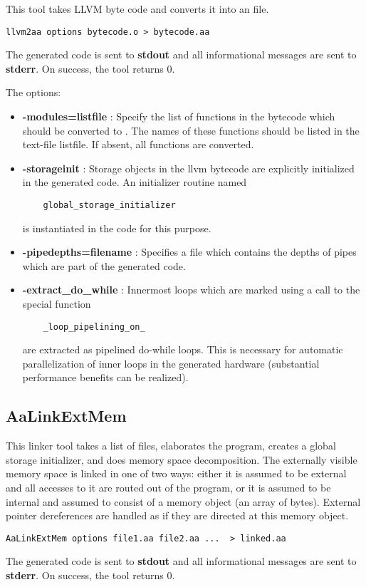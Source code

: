 This tool takes LLVM byte code and converts it into an
\Aa file.
\begin{verbatim}
llvm2aa options bytecode.o > bytecode.aa
\end{verbatim}
The generated \Aa code is sent to {\bf stdout} and all informational
messages are sent to {\bf stderr}.  On success, the tool returns 0.

The options:
\begin{itemize}
\item {\bf -modules=listfile} : Specify the list of functions in the bytecode
which should be converted to \Aa.   The names of these functions should be
listed in the text-file listfile. If absent, all functions
are converted.
\item {\bf -storageinit} :  Storage objects in the llvm bytecode
are explicitly initialized in the generated \Aa code.   An initializer
routine named
\begin{verbatim}
    global_storage_initializer
\end{verbatim}
is instantiated in
the \Aa code for this purpose.
\item {\bf -pipedepths=filename} : Specifies a file which contains
the depths of pipes which are part of the generated \Aa code.
\item {\bf -extract\_do\_while} : Innermost loops which are marked
using a call to the special function 
\begin{verbatim}
    _loop_pipelining_on_
\end{verbatim}
are extracted as pipelined do-while loops.  This is necessary
for automatic parallelization of inner loops in the 
generated hardware (substantial performance benefits can be
realized).
\end{itemize}

\subsection{{\bf AaLinkExtMem}}

This linker tool takes a list of \Aa files, elaborates the program,
creates a global storage initializer, and
does memory space decomposition.  The externally visible memory space is
linked in one of two ways: either it is assumed to be external
and all accesses to it are routed out of the \Aa program,
or it is assumed to be internal and assumed to consist of
a memory object (an array of bytes).  External pointer dereferences
are handled as if they are directed at this memory object.
\begin{verbatim}
AaLinkExtMem options file1.aa file2.aa ...  > linked.aa
\end{verbatim}
The generated \Aa code is sent to {\bf stdout} and all informational
messages are sent to {\bf stderr}.  On success, the tool returns 0.

